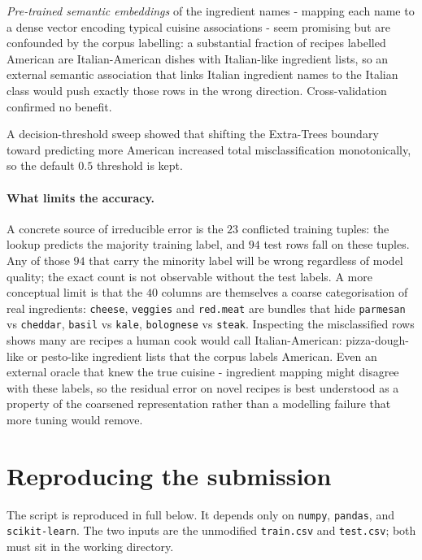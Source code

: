 \documentclass[11pt,a4paper]{article}
\begin{document}
\textit{Pre-trained
semantic embeddings} of the ingredient names - mapping each name to a dense vector
encoding typical cuisine associations - seem promising but are confounded by the corpus
labelling: a substantial fraction of recipes labelled American are Italian-American dishes
with Italian-like ingredient lists, so an external semantic association that links Italian
ingredient names to the Italian class would push exactly those rows in the wrong direction.
Cross-validation confirmed no benefit. 

A decision-threshold sweep showed that shifting the
Extra-Trees boundary toward predicting more American increased total misclassification
monotonically, so the default $0.5$ threshold is kept.

\paragraph{What limits the accuracy.} A concrete source of irreducible error is the $23$
conflicted training tuples: the lookup predicts the majority training label, and $94$ test
rows fall on these tuples. Any of those $94$ that carry the minority label will be wrong
regardless of model quality; the exact count is not observable without the test labels. A more conceptual
limit is that the $40$ columns are themselves a coarse categorisation of real
ingredients: \texttt{cheese}, \texttt{veggies} and \texttt{red.meat} are bundles that hide
\texttt{parmesan} vs \texttt{cheddar}, \texttt{basil} vs \texttt{kale},
\texttt{bolognese} vs \texttt{steak}. Inspecting the misclassified rows shows many are
recipes a human cook would call Italian-American: pizza-dough-like or pesto-like
ingredient lists that the corpus labels American. Even an external oracle that knew the
true cuisine - ingredient mapping might disagree with these labels, so the residual error
on novel recipes is best understood as a property of the coarsened representation rather
than a modelling failure that more tuning would remove.

\section{Reproducing the submission}

The script is reproduced in full below. It depends only on \texttt{numpy},
\texttt{pandas}, and \texttt{scikit-learn}.  The two inputs are
the unmodified \texttt{train.csv} and \texttt{test.csv}; both must sit in the working
directory.


\end{document}
